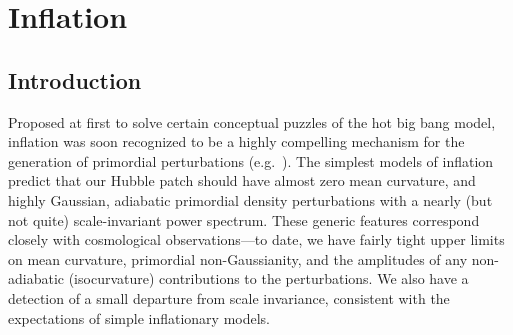  
\chapter{Inflation}
\label{sec:inflation}


\bigskip

\begin{quotation}

\end{quotation}
\section{Introduction}



Proposed at first to solve certain conceptual puzzles of the hot big bang
model, inflation was soon recognized to be a highly compelling mechanism for
the generation of primordial perturbations
(e.g.\ \cite{Abbott:1986kb,Linde:2005ht,Lemoine:2008zz,EllisWands}).
The simplest models of inflation predict that our Hubble patch should have
almost zero mean curvature, and highly Gaussian, adiabatic primordial density perturbations with a nearly (but not quite)
scale-invariant power spectrum.
These generic features correspond closely with cosmological observations---to 
date, we have fairly tight upper limits on mean curvature, primordial
non-Gaussianity, and the amplitudes of any non-adiabatic (isocurvature)
contributions to the perturbations. We also have a detection of a small
departure from scale invariance, consistent with the expectations of simple
inflationary models.

